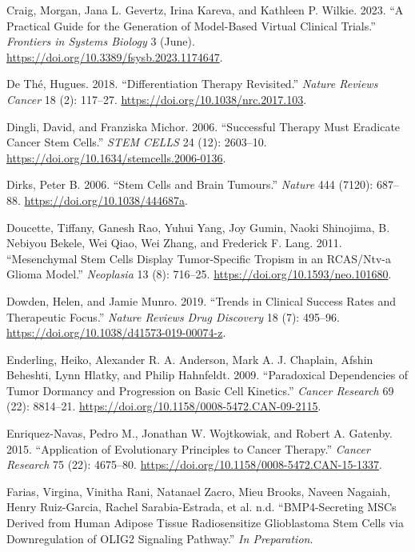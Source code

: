 \documentclass[
  letterpaper,
]{scrreprt}
\newlength{\cslhangindent}
\newenvironment{CSLReferences}[2] %
 {\begin{list}{}{%
  \setlength{\itemindent}{0pt}
  \setlength{\leftmargin}{0pt}
  \setlength{\parsep}{0pt}
  \ifodd #1
   \setlength{\leftmargin}{\cslhangindent}
   \setlength{\itemindent}{-1\cslhangindent}
  \fi
  \setlength{\itemsep}{#2\baselineskip}}}
 {\end{list}}
\theoremstyle{definition}
\theoremstyle{remark}
\begin{document}
\begin{CSLReferences}{1}{0}
Craig, Morgan, Jana L. Gevertz, Irina Kareva, and Kathleen P. Wilkie.
2023. {``A Practical Guide for the Generation of Model-Based Virtual
Clinical Trials.''} \emph{Frontiers in Systems Biology} 3 (June).
\url{https://doi.org/10.3389/fsysb.2023.1174647}.

De Thé, Hugues. 2018. {``Differentiation Therapy Revisited.''}
\emph{Nature Reviews Cancer} 18 (2): 117--27.
\url{https://doi.org/10.1038/nrc.2017.103}.

Dingli, David, and Franziska Michor. 2006. {``Successful Therapy Must
Eradicate Cancer Stem Cells.''} \emph{STEM CELLS} 24 (12): 2603--10.
\url{https://doi.org/10.1634/stemcells.2006-0136}.

Dirks, Peter B. 2006. {``Stem Cells and Brain Tumours.''} \emph{Nature}
444 (7120): 687--88. \url{https://doi.org/10.1038/444687a}.

Doucette, Tiffany, Ganesh Rao, Yuhui Yang, Joy Gumin, Naoki Shinojima,
B. Nebiyou Bekele, Wei Qiao, Wei Zhang, and Frederick F. Lang. 2011.
{``Mesenchymal Stem Cells Display Tumor-Specific Tropism in an
RCAS/Ntv-a Glioma Model.''} \emph{Neoplasia} 13 (8): 716--25.
\url{https://doi.org/10.1593/neo.101680}.

Dowden, Helen, and Jamie Munro. 2019. {``Trends in Clinical Success
Rates and Therapeutic Focus.''} \emph{Nature Reviews Drug Discovery} 18
(7): 495--96. \url{https://doi.org/10.1038/d41573-019-00074-z}.

Enderling, Heiko, Alexander R. A. Anderson, Mark A. J. Chaplain, Afshin
Beheshti, Lynn Hlatky, and Philip Hahnfeldt. 2009. {``Paradoxical
Dependencies of Tumor Dormancy and Progression on Basic Cell
Kinetics.''} \emph{Cancer Research} 69 (22): 8814--21.
\url{https://doi.org/10.1158/0008-5472.CAN-09-2115}.

Enriquez-Navas, Pedro M., Jonathan W. Wojtkowiak, and Robert A. Gatenby.
2015. {``Application of Evolutionary Principles to Cancer Therapy.''}
\emph{Cancer Research} 75 (22): 4675--80.
\url{https://doi.org/10.1158/0008-5472.CAN-15-1337}.

Farias, Virgina, Vinitha Rani, Natanael Zacro, Mieu Brooks, Naveen
Nagaiah, Henry Ruiz-Garcia, Rachel Sarabia-Estrada, et al. n.d.
{``BMP4-Secreting MSCs Derived from Human Adipose Tissue Radiosensitize
Glioblastoma Stem Cells via Downregulation of OLIG2 Signaling
Pathway.''} \emph{In Preparation}.


\end{CSLReferences}
\end{document}

